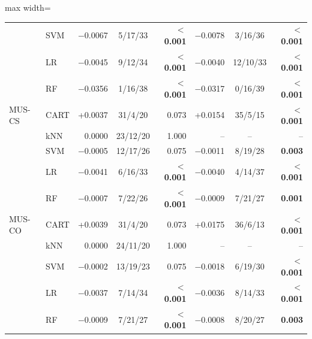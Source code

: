 \begin{table}[!htbp]
\begin{adjustbox}{max width=\linewidth}
\begin{tabular}{llrcrrcr}
 & SVM & $-$0.0067 & 5/17/33 & \textbf{$<$0.001} & $-$0.0078 & 3/16/36 & \textbf{$<$0.001} \\
 & LR & $-$0.0045 & 9/12/34 & \textbf{$<$0.001} & $-$0.0040 & 12/10/33 & \textbf{$<$0.001} \\
 & RF & $-$0.0356 & 1/16/38 & \textbf{$<$0.001} & $-$0.0317 & 0/16/39 & \textbf{$<$0.001} \\
\midrule
MUS-CS & CART & +0.0037 & 31/4/20 & 0.073 & +0.0154 & 35/5/15 & \textbf{$<$0.001} \\
 & kNN & 0.0000 & 23/12/20 & 1.000 & -- & -- & -- \\
 & SVM & $-$0.0005 & 12/17/26 & 0.075 & $-$0.0011 & 8/19/28 & \textbf{0.003} \\
 & LR & $-$0.0041 & 6/16/33 & \textbf{$<$0.001} & $-$0.0040 & 4/14/37 & \textbf{$<$0.001} \\
 & RF & $-$0.0007 & 7/22/26 & \textbf{$<$0.001} & $-$0.0009 & 7/21/27 & \textbf{0.001} \\
\midrule
MUS-CO & CART & +0.0039 & 31/4/20 & 0.073 & +0.0175 & 36/6/13 & \textbf{$<$0.001} \\
 & kNN & 0.0000 & 24/11/20 & 1.000 & -- & -- & -- \\
 & SVM & $-$0.0002 & 13/19/23 & 0.075 & $-$0.0018 & 6/19/30 & \textbf{$<$0.001} \\
 & LR & $-$0.0037 & 7/14/34 & \textbf{$<$0.001} & $-$0.0036 & 8/14/33 & \textbf{$<$0.001} \\
 & RF & $-$0.0009 & 7/21/27 & \textbf{$<$0.001} & $-$0.0008 & 8/20/27 & \textbf{0.003} \\
\bottomrule
\end{tabular}
\end{adjustbox}
\end{table}
